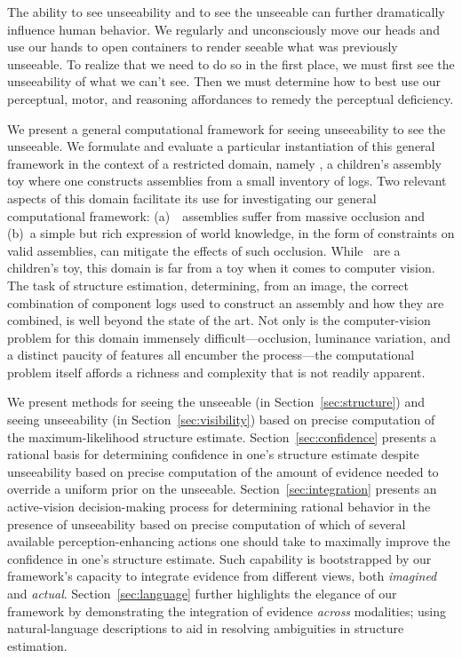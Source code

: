 The ability to see unseeability and to see the unseeable can further
dramatically influence human behavior.
%
We regularly and unconsciously move our heads and use our hands to open
containers to render seeable what was previously unseeable.
%
To realize that we need to do so in the first place, we must first see the
unseeability of what we can't see.
%
Then we must determine how to best use our perceptual, motor, and reasoning
affordances to remedy the perceptual deficiency.

We present a general computational framework for seeing unseeability to see the
unseeable.
%
We formulate and evaluate a particular instantiation of this general framework
in the context of a restricted domain, namely \LincolnLogs, a children's
assembly toy where one constructs assemblies from a small inventory of logs.
%
Two relevant aspects of this domain facilitate its use for investigating our
general computational framework: (a)~\LincolnLog\ assemblies suffer from
massive occlusion and (b)~a simple but rich expression of world knowledge, in
the form of constraints on valid assemblies, can mitigate the effects of such
occlusion.
%
While \LincolnLogs\ are a children's toy, this domain is far from a toy when it
comes to computer vision.
%
The task of structure estimation, determining, from an image, the correct
combination of component logs used to construct an assembly and how they are
combined, is well beyond the state of the art.
%
Not only is the computer-vision problem for this domain immensely
difficult---occlusion, luminance variation, and a distinct paucity of features
all encumber the process---the computational problem itself affords a richness
and complexity that is not readily apparent.

We present methods for seeing the unseeable (in Section~\ref{sec:structure})
and seeing unseeability (in Section~\ref{sec:visibility}) based on precise
computation of the maximum-likelihood structure estimate.
%
Section~\ref{sec:confidence} presents a rational basis for determining
confidence in one's structure estimate despite unseeability based on precise
computation of the amount of evidence needed to override a uniform prior on the
unseeable.
%
Section~\ref{sec:integration} presents an active-vision decision-making
process for determining rational behavior in the presence of unseeability based
on precise computation of which of several available perception-enhancing
actions one should take to maximally improve the confidence in one's structure
estimate.
%
Such capability is bootstrapped by our framework's capacity to integrate
evidence from different views, both \emph{imagined} and \emph{actual}.
%
Section~\ref{sec:language} further highlights the elegance of our framework by
demonstrating the integration of evidence \emph{across} modalities; using
natural-language descriptions to aid in resolving ambiguities in structure
estimation.

